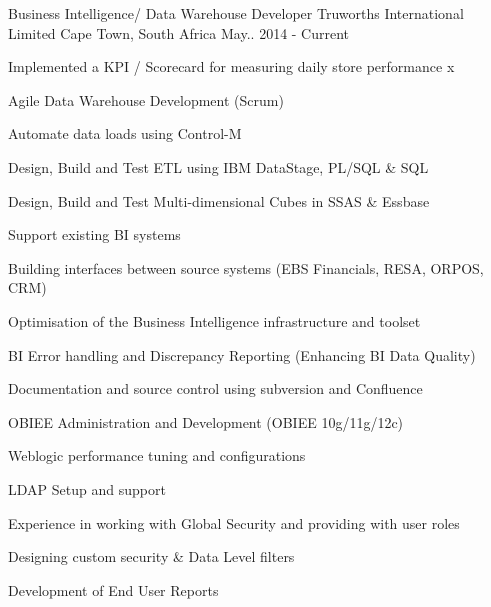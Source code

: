 


\begin{cventries}


\cventry
{Business Intelligence/ Data Warehouse Developer} %
{Truworths International Limited} %
{Cape Town, South Africa} %
{May.. 2014 - Current} %
{ %
\begin{cvitems}
\item Implemented a KPI / Scorecard for measuring daily store performance x
\item Agile Data Warehouse Development (Scrum)
\item Automate data loads using Control-M
\item Design, Build and Test ETL using IBM DataStage, PL/SQL \& SQL
\item Design, Build and Test Multi-dimensional Cubes in SSAS \& Essbase
\item Support existing BI systems 
\item Building interfaces between source systems (EBS Financials, RESA, ORPOS, CRM)
\item Optimisation of the Business Intelligence infrastructure and toolset
\item BI Error handling and Discrepancy Reporting (Enhancing BI Data Quality)
\item Documentation and source control using subversion and Confluence
\item OBIEE Administration and Development (OBIEE 10g/11g/12c)
\item Weblogic performance tuning and configurations
\item LDAP Setup and support
\item Experience in working with Global Security and providing with user roles
\item Designing custom security \& Data Level filters
\item Development of End User Reports 

\end{cvitems}}
\end{cventries}
